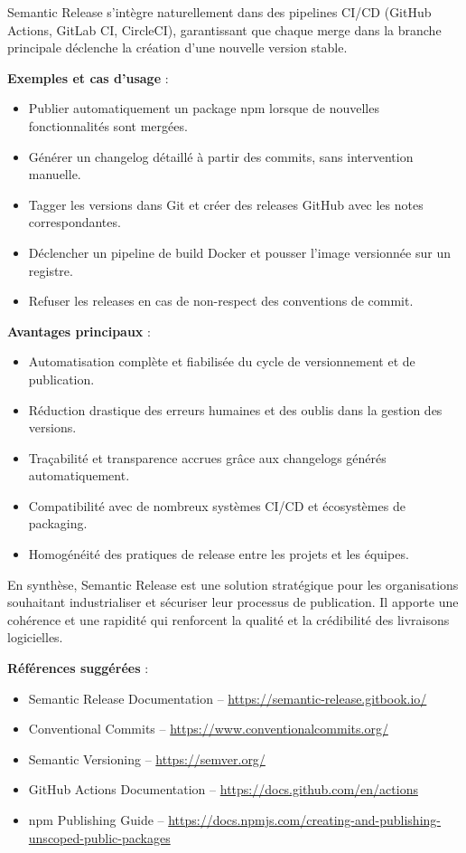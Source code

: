 Semantic Release s’intègre naturellement dans des pipelines CI/CD (GitHub Actions, GitLab CI, CircleCI), garantissant que chaque merge dans la branche principale déclenche la création d’une nouvelle version stable.

\textbf{Exemples et cas d’usage} :
\begin{itemize}
	\item Publier automatiquement un package npm lorsque de nouvelles fonctionnalités sont mergées.
	\item Générer un changelog détaillé à partir des commits, sans intervention manuelle.
	\item Tagger les versions dans Git et créer des releases GitHub avec les notes correspondantes.
	\item Déclencher un pipeline de build Docker et pousser l’image versionnée sur un registre.
	\item Refuser les releases en cas de non-respect des conventions de commit.
\end{itemize}

\textbf{Avantages principaux} :
\begin{itemize}
	\item Automatisation complète et fiabilisée du cycle de versionnement et de publication.
	\item Réduction drastique des erreurs humaines et des oublis dans la gestion des versions.
	\item Traçabilité et transparence accrues grâce aux changelogs générés automatiquement.
	\item Compatibilité avec de nombreux systèmes CI/CD et écosystèmes de packaging.
	\item Homogénéité des pratiques de release entre les projets et les équipes.
\end{itemize}

En synthèse, Semantic Release est une solution stratégique pour les organisations souhaitant industrialiser et sécuriser leur processus de publication. Il apporte une cohérence et une rapidité qui renforcent la qualité et la crédibilité des livraisons logicielles.

\textbf{Références suggérées} :
\begin{itemize}
	\item Semantic Release Documentation – \url{https://semantic-release.gitbook.io/}
	\item Conventional Commits – \url{https://www.conventionalcommits.org/}
	\item Semantic Versioning – \url{https://semver.org/}
	\item GitHub Actions Documentation – \url{https://docs.github.com/en/actions}
	\item npm Publishing Guide – \url{https://docs.npmjs.com/creating-and-publishing-unscoped-public-packages}
\end{itemize}
